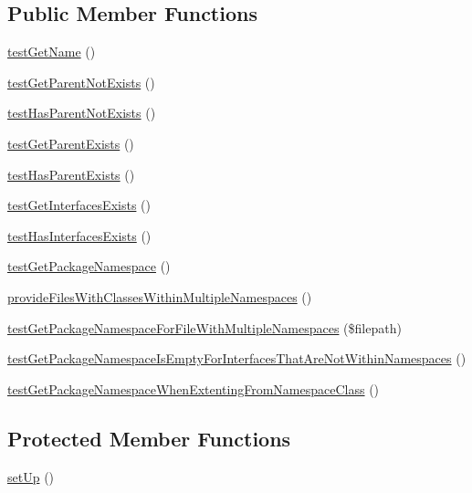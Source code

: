 \subsection*{Public Member Functions}
\begin{DoxyCompactItemize}
\item 
\mbox{\hyperlink{class_p_h_p___token___interface_test_a20d1601e22a17dad9eb8c9050676ef70}{test\+Get\+Name}} ()
\item 
\mbox{\hyperlink{class_p_h_p___token___interface_test_a34907981842ac92123b9ca9ca631f2b9}{test\+Get\+Parent\+Not\+Exists}} ()
\item 
\mbox{\hyperlink{class_p_h_p___token___interface_test_a09f03df350b25541554b2778d46546eb}{test\+Has\+Parent\+Not\+Exists}} ()
\item 
\mbox{\hyperlink{class_p_h_p___token___interface_test_a881ca30599fa70d81299d2bac17f802f}{test\+Get\+Parent\+Exists}} ()
\item 
\mbox{\hyperlink{class_p_h_p___token___interface_test_a33d0c29491b97fea29b7bf746b39795b}{test\+Has\+Parent\+Exists}} ()
\item 
\mbox{\hyperlink{class_p_h_p___token___interface_test_a3db94b84f408df713415c4c17cd59f59}{test\+Get\+Interfaces\+Exists}} ()
\item 
\mbox{\hyperlink{class_p_h_p___token___interface_test_a72a50a9435982bda113e188e20354a48}{test\+Has\+Interfaces\+Exists}} ()
\item 
\mbox{\hyperlink{class_p_h_p___token___interface_test_a62fdb5f6ee04537965defac169844269}{test\+Get\+Package\+Namespace}} ()
\item 
\mbox{\hyperlink{class_p_h_p___token___interface_test_a330542c026471f7c9a8310a8ac2c25e4}{provide\+Files\+With\+Classes\+Within\+Multiple\+Namespaces}} ()
\item 
\mbox{\hyperlink{class_p_h_p___token___interface_test_a08ca49d6dea31d92649857a8ee5d9d52}{test\+Get\+Package\+Namespace\+For\+File\+With\+Multiple\+Namespaces}} (\$filepath)
\item 
\mbox{\hyperlink{class_p_h_p___token___interface_test_a397a3afeaa0b208f2d6de30c48ca9755}{test\+Get\+Package\+Namespace\+Is\+Empty\+For\+Interfaces\+That\+Are\+Not\+Within\+Namespaces}} ()
\item 
\mbox{\hyperlink{class_p_h_p___token___interface_test_aa612799a3f6d712a4a20aee816a25d83}{test\+Get\+Package\+Namespace\+When\+Extenting\+From\+Namespace\+Class}} ()
\end{DoxyCompactItemize}
\subsection*{Protected Member Functions}
\begin{DoxyCompactItemize}
\item 
\mbox{\hyperlink{class_p_h_p___token___interface_test_a0bc688732d2b3b162ffebaf7812e78da}{set\+Up}} ()
\end{DoxyCompactItemize}
